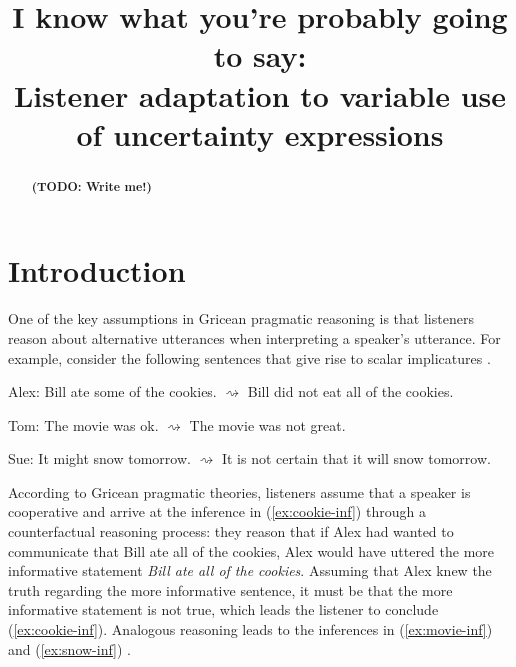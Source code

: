 \documentclass[lucida,biblatex]{sp} %
\title{I know what you're probably going to say: \\ Listener adaptation to variable use of uncertainty expressions}
\author{%
  \spauthor{Sebastian Schuster and Judith Degen\\ \today}
}
\newcommand{\todo}[1]{}
\renewcommand{\todo}[1]{{\bf \color{red} (TODO: {#1})}}
\begin{document}

\maketitle

\begin{abstract}
\todo{Write me!}
\end{abstract}



\section{Introduction}


One of the key assumptions in Gricean pragmatic reasoning \citep{Grice1975} is that listeners reason about alternative utterances when interpreting a speaker's utterance. For example, consider the following sentences that give rise to scalar implicatures \citep{Horn1984}.

\begin{exe}
  \ex 
  \begin{xlist}
    \ex Alex: Bill ate some of the cookies.
    \ex \label{ex:cookie-inf} $\rightsquigarrow$ Bill did not eat all of the cookies.
  \end{xlist}
  \ex 
  \begin{xlist} 
    \ex Tom: The movie was ok.
    \ex \label{ex:movie-inf} $\rightsquigarrow$  The movie was not great.
  \end{xlist}
  \ex 
  \begin{xlist} 
    \ex Sue: It might snow tomorrow.
    \ex \label{ex:snow-inf} $\rightsquigarrow$  It is not certain that it will snow tomorrow.
  \end{xlist}
\end{exe}
According to Gricean pragmatic theories, listeners assume that a speaker is cooperative and arrive at the inference in (\ref{ex:cookie-inf}) through a counterfactual reasoning process: they reason that if Alex had wanted to communicate that Bill ate all of the cookies, Alex would have uttered the more informative statement \textit{Bill ate all of the cookies}. Assuming that Alex knew the truth regarding the more informative sentence, it must be that the more informative statement is not true, which leads the listener to conclude (\ref{ex:cookie-inf}). Analogous reasoning leads to the inferences in (\ref{ex:movie-inf})  and (\ref{ex:snow-inf}) .
\end{document}
